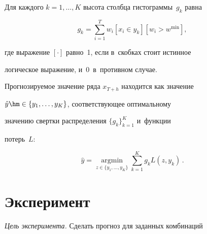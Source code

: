 Для каждого $k=1,\ldots,K$ высота столбца гистограммы~$g_k$ равна





\noindent


\begin{equation}


\label{weighted_sum}


    g_k = \sum\limits_{i=1}^T w_i\left[x_i\in y_k\right]\left[w_i>w^{\min}\right],


\end{equation}


где выражение $[\cdot]$ равно~1, если в~скобках стоит истинное


логическое выражение, и~0~в~противном случае.





Прогнозируемое значение ряда $x_{T+h}$ находится как значение


$\hat{y}\hm\in\{y_1,\ldots,y_K\}$, соответствующее оптимальному


значению свертки распределения $\{g_k\}_{k=1}^K$ и~функции


потерь~$L$:





\noindent


\begin{equation*}




    \hat{y} =


    \mathop{\mathrm{argmin}}\limits_{z\in\{y_1,\ldots,y_K\}}\sum\limits_{k=1}^K{g_k


    L(z,y_k)}\,.


\end{equation*}








\vspace*{-12pt}





\section{Эксперимент}


\label{experiment}





\textit{Цель эксперимента.} Сделать прогноз для заданных комбинаций


